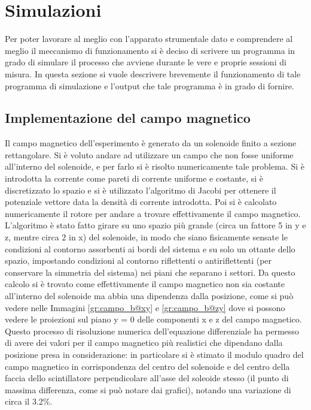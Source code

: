 \section{Simulazioni}
Per poter lavorare al meglio con l'apparato strumentale dato e comprendere al meglio il meccanismo di funzionamento si è deciso di scrivere un programma in grado di simulare
il processo che avviene durante le vere e proprie sessioni di misura. In questa sezione si vuole descrivere brevemente il funzionamento di tale programma di simulazione e
l'output che tale programma è in grado di fornire.







\subsection{Implementazione del campo magnetico}
Il campo magnetico dell'esperimento è generato da un solenoide finito a sezione rettangolare. 
Si è voluto andare ad utilizzare un campo che non fosse uniforme all'interno del solenoide, e per farlo si è risolto numericamente tale problema. 
Si è introdotta la corrente come pareti di corrente uniforme e costante, si è discretizzato lo spazio e si è utilizzato l'algoritmo di Jacobi per ottenere il potenziale vettore data la densità di corrente introdotta. 
Poi si è calcolato numericamente il rotore per andare a trovare effettivamente il campo magnetico. 
L'algoritmo è stato fatto girare su uno spazio più grande (circa un fattore 5 in y e z, mentre circa 2 in x) del solenoide, in modo che siano fisicamente sensate le condizioni al contorno assorbenti ai bordi del sistema e su solo un ottante dello spazio, impostando condizioni al contorno riflettenti o antiriflettenti (per conservare la simmetria del sistema) nei piani che separano i settori. Da questo calcolo si è trovato come effettivamente il campo magnetico non sia costante all'interno del solenoide ma abbia una dipendenza dalla posizione, come si può vedere nelle Immagini \ref{gr:campo_b@xy} e \ref{gr:campo_b@zy} dove si possono vedere le proiezioni sul piano y = 0 delle componenti x e z del campo magnetico. 
Questo processo di risoluzione numerica dell'equazione differenziale ha permesso di avere dei valori per il campo magnetico più realistici che dipendano dalla posizione presa in considerazione: in particolare si \`e stimato il modulo quadro del campo magnetico in corrispondenza del centro del solenoide e del centro della faccia dello scintillatore perpendicolare all'asse del soleoide stesso (il punto di massima differenza, come si pu\`o notare dai grafici), notando una variazione di circa il 3.2\%. 

